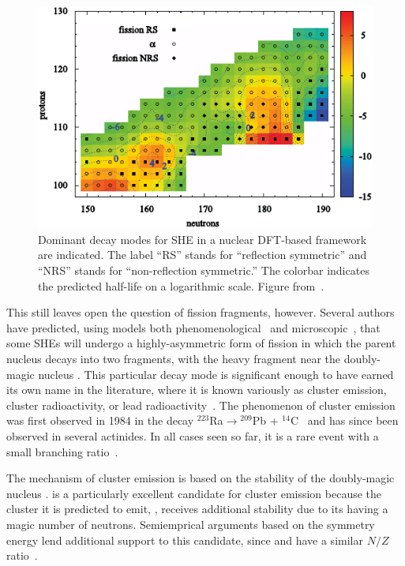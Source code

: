 \begin{figure}
	\centering
	\includegraphics[width=0.7\linewidth]{TeX_files/294Og_Warda2012_SHE}
	\caption[Dominant decay modes for SHE in a nuclear DFT-based framework.]{Dominant decay modes for SHE in a nuclear DFT-based framework are indicated. The label ``RS'' stands for ``reflection symmetric'' and ``NRS'' stands for ``non-reflection symmetric.'' The colorbar indicates the predicted half-life on a logarithmic scale. Figure from~\cite{Warda2012}.}
	\label{fig:warda2012she}
\end{figure}

This still leaves open the question of fission fragments, however. Several authors have predicted, using models both phenomenological~\cite{Poenaru2011, Poenaru2012, Poenaru2013, Poenaru2015, Poenaru2018,Santhosh2018, Zhang2018} and microscopic~\cite{Warda2018}, that some SHEs will undergo a highly-asymmetric form of fission in which the parent nucleus decays into two fragments, with the heavy fragment near the doubly-magic nucleus {\Pb}. This particular decay mode is significant enough to have earned its own name in the literature, where it is known variously as cluster emission, cluster radioactivity, or lead radioactivity~\cite{Sandulescu1980,Poenaru1986,Royer1998,Poenaru2010,Warda2011}. The phenomenon of cluster emission was first observed in 1984 in the decay $^{223}$Ra$\rightarrow$$^{209}$Pb + $^{14}$C~\cite{Rose1984} and has since been observed in several actinides. In all cases seen so far, it is a rare event with a small branching ratio~\cite{Poenaru2010}.

The mechanism of cluster emission is based on the stability of the doubly-magic nucleus {\Pb}. {\Og} is a particularly excellent candidate for cluster emission because the cluster it is predicted to emit, {\Kr}, receives additional stability due to its having a magic number of neutrons.  Semiemprical arguments based on the symmetry energy lend additional support to this candidate, since {\Og} and {\Pb} have a similar $N/Z$ ratio~\cite{Warda2018}.

